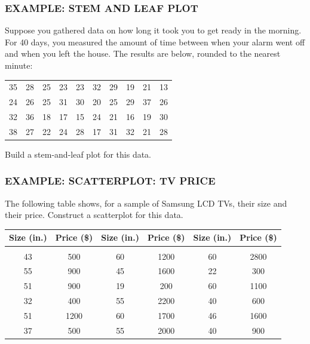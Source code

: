\documentclass[8pt]{beamer}
\newcommand{\extitle}[1]{\frametitle{\fontfamily{fvs}\selectfont \small\color{black!70!blue!80!cyan}\uppercase{\bfseries Example: #1}}}
\def\solblank{\begin{tcolorbox}[colframe=black!50!blue!50!cyan,
colback=white,
bottomrule=0mm,
rightrule=0mm,
sharp corners=all] 
\vspace{6in}
\text{}
\end{tcolorbox}}
\begin{document}
\begin{frame}
\extitle{Stem and Leaf Plot}
Suppose you gathered data on how long it took you to get ready in the morning.  For 40 days, you measured the amount of time between when your alarm went off and when you left the house.  The results are below, rounded to the nearest minute:
\begin{center}
\begin{tabular}{c c c c c c c c c c}
35 & 28 & 25 & 23 & 23 & 32 & 29 & 19 & 21 & 13\\
24 & 26 & 25 & 31 & 30 & 20 & 25 & 29 & 37 & 26\\
32 & 36 & 18 & 17 & 15 & 24 & 21 & 16 & 19 & 30\\
38 & 27 & 22 & 24 & 28 & 17 & 31 & 32 & 21 & 28\\
\end{tabular}
\end{center}
Build a stem-and-leaf plot for this data.

\solblank
\end{frame}

\begin{frame}
\extitle{Scatterplot: TV Price}
{\footnotesize The following table shows, for a sample of Samsung LCD TVs, their size and their price.  Construct a scatterplot for this data.
\begin{center}
\begin{tabular}{c c | c c | c c}
Size (in.) & Price (\$) & Size (in.) & Price (\$) & Size (in.) & Price (\$)\\
\hline
\\
43 & 500 & 60 & 1200 & 60 & 2800\\
55 & 900 & 45 & 1600 & 22 & 300\\
51 & 900 & 19 & 200 & 60 & 1100\\
32 & 400 & 55 & 2200 & 40 & 600\\
51 & 1200 & 60 & 1700 & 46 & 1600\\
37 & 500 & 55 & 2000 & 40 & 900
\end{tabular}
\end{center}}

\solblank
\end{frame}
\end{document}
